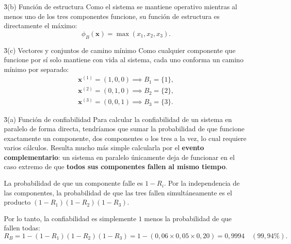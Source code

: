 \documentclass[practices.tex]{subfiles}%
\begin{document}
\h3{(b) Función de estructura}
Como el sistema se mantiene operativo mientras al menos uno de los tres componentes funcione, su función de estructura es directamente el máximo:
\begin{equation*}
    \phi_B(\mathbf{x}) = \max(x_1, x_2, x_3).
\end{equation*}

\h3{(c) Vectores y conjuntos de camino mínimo}
Como cualquier componente que funcione por sí solo mantiene con vida al sistema, cada uno conforma un camino mínimo por separado:
\begin{gather*}
    \mathbf{x}^{(1)} = (1, 0, 0) \implies B_1 = \{1\}, \\
    \mathbf{x}^{(2)} = (0, 1, 0) \implies B_2 = \{2\}, \\
    \mathbf{x}^{(3)} = (0, 0, 1) \implies B_3 = \{3\}.
\end{gather*}

\h3{(a) Función de confiabilidad}
Para calcular la confiabilidad de un sistema en paralelo de forma directa, tendríamos que sumar la probabilidad de que funcione exactamente un componente, dos componentes o los tres a la vez, lo cual requiere varios cálculos. Resulta mucho más simple calcularla por el \textbf{evento complementario}: un sistema en paralelo únicamente deja de funcionar en el caso extremo de que \textbf{todos sus componentes fallen al mismo tiempo}.

La probabilidad de que un componente falle es $1 - R_i$. Por la independencia de las componentes, la probabilidad de que las tres fallen simultáneamente es el producto $(1 - R_1)(1 - R_2)(1 - R_3)$.

Por lo tanto, la confiabilidad es simplemente $1$ menos la probabilidad de que fallen todas:
\begin{equation*}
    R_B = 1 - (1 - R_1)(1 - R_2)(1 - R_3) = 1 - (0{,}06 \times 0{,}05 \times 0{,}20) = 0{,}9994 \quad (99{,}94\%).
\end{equation*}


\newpage
{}
\end{document}
